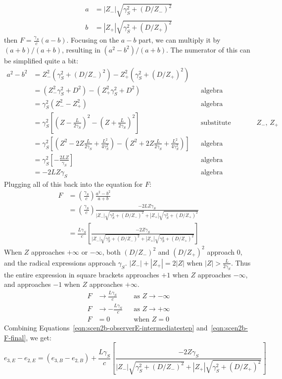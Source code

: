 \documentclass[a4paper]{article}
\theoremstyle{plain}
\theoremstyle{definition}
\begin{document}
\begin{align*}
a & = |Z_{-}| \sqrt{ \gamma_S^2 + (D/Z_{-})^2 } \\
b & = |Z_{+}| \sqrt{ \gamma_S^2 + (D/Z_{+})^2 }
\end{align*}
then $F = \frac{\gamma_S}{c} (a-b)$.  Focusing on the $a-b$ part, we
can multiply it by $(a+b)/(a+b)$, resulting in $(a^2-b^2)/(a+b)$.  The
numerator of this can be simplified quite a bit:
\begin{align*}
a^2 - b^2
  & = Z_{-}^2 ( \gamma_S^2 + (D/Z_{-})^2 ) - Z_{+}^2 ( \gamma_S^2 + (D/Z_{+})^2 ) \\
  & = ( Z_{-}^2 \gamma_S^2 + D^2 ) - (Z_{+}^2 \gamma_S^2 + D^2 ) & & \text{algebra} \\
  & = \gamma_S^2 (Z_{-}^2 - Z_{+}^2) & & \text{algebra} \\
  & = \gamma_S^2 \left[ (Z-\frac{L}{2\gamma_S})^2 - (Z+\frac{L}{2\gamma_S})^2 \right] & & \text{substitute definitinos of $Z_{-}$, $Z_{+}$} \\
  & = \gamma_S^2 \left[ (Z^2-2Z\frac{L}{2\gamma_S} + \frac{L^2}{4\gamma_S^2}) - (Z^2+2Z\frac{L}{2\gamma_S} + \frac{L^2}{4\gamma_S^2}) \right] & & \text{algebra} \\
  & = \gamma_S^2 \left[ -\frac{2LZ}{\gamma_S} \right] & & \text{algebra} \\
  & = -2LZ\gamma_S & & \text{algebra}
\end{align*}
Plugging all of this back into the equation for $F$:
\begin{align}
F
  & = (\frac{\gamma_S}{c}) \frac{a^2-b^2}{a+b} \nonumber \\
  & = (\frac{\gamma_S}{c}) \frac{-2LZ\gamma_S}{|Z_{-}| \sqrt{ \gamma_S^2 + (D/Z_{-})^2 } + |Z_{+}| \sqrt{ \gamma_S^2 + (D/Z_{+})^2 }} \nonumber \\
  & = \frac{L\gamma_S}{c} \left[ \frac{-2Z\gamma_S}{|Z_{-}| \sqrt{ \gamma_S^2 + (D/Z_{-})^2 } + |Z_{+}| \sqrt{ \gamma_S^2 + (D/Z_{+})^2 }} \right] \label{eqn:scen2b-F-final}
\end{align}
When $Z$ approaches $+\infty$ or $-\infty$,
both $(D/Z_{-})^2$ and $(D/Z_{+})^2$ approach 0,
and the radical expressions approach $\gamma_S$.
$|Z_{-}| + |Z_{+}| = 2|Z|$ when $|Z| > \frac{L}{2 \gamma_S}$.
Thus the entire expression in square brackets
approaches $+1$ when $Z$ approaches $-\infty$,
and approaches $-1$ when $Z$ approaches $+\infty$.
\begin{align*}
F & \rightarrow \frac{L\gamma_S}{c} & & \text{as $Z \rightarrow -\infty$} \\
F & \rightarrow -\frac{L\gamma_S}{c} & & \text{as $Z \rightarrow +\infty$} \\
F & = 0 & & \text{when $Z=0$}
\end{align*}
Combining Equations~\eqref{eqn:scen2b-observerE-intermediatestep}
and~\eqref{eqn:scen2b-F-final}, we get:
\begin{equation}
e_{3,E}-e_{2,E}
  = (e_{3,B}-e_{2,B}) +
  \frac{L\gamma_S}{c} \left[ \frac{-2Z\gamma_S}{|Z_{-}| \sqrt{ \gamma_S^2 + (D/Z_{-})^2 } + |Z_{+}| \sqrt{ \gamma_S^2 + (D/Z_{+})^2 }} \right] \label{appeqn:scen2b-observerE-finalstep}
\end{equation}
\end{document}
